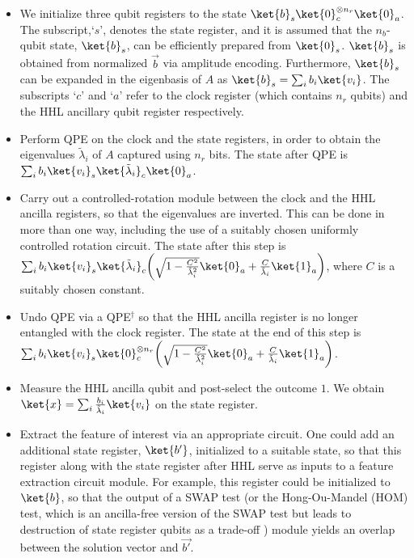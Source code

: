 \documentclass[%
 reprint,
 superscriptaddress,
 amsmath,amssymb,
 aps,
 pra,
floatfix,
nofootinbib,
]{revtex4-2}
\theoremstyle{definition}
\theoremstyle{remark}
\begin{document}
\begin{appendix}
\begin{itemize} 
\item We initialize three qubit registers to the state $\ket{b}_s\ket{0}^{\otimes n_r}_c\ket{0}_a$. The subscript,`$s$', denotes the state register, and it is assumed that the $n_b$-qubit state, $\ket{b}_s$, can be efficiently prepared from $\ket{0}_s$. $\ket{b}_s$ is obtained from normalized $\vec{b}$ via amplitude encoding. Furthermore, $\ket{b}_s$ can be expanded in the eigenbasis of $A$ as $\ket{b}_s=\sum_i b_i\ket{v_i}$. The subscripts `$c$' and `$a$' refer to the clock register (which contains $n_r$ qubits) and the HHL ancillary qubit register respectively. 
\item Perform QPE on the clock and the state registers, in order to obtain the eigenvalues ${\tilde{\lambda}_i}$ of $A$ captured using $n_r$ bits. The state after QPE is $\sum_i b_i\ket{v_i}_s\ket{\tilde{\lambda}_i}_c\ket{0}_a$. 
\item Carry out a controlled-rotation module between the clock and the HHL ancilla registers, so that the eigenvalues are inverted. This can be done in more than one way, including the use of a suitably chosen uniformly controlled rotation circuit. The state after this step is $\sum_i b_i\ket{v_i}_s\ket{\tilde{\lambda}_i}_c\bigg(\sqrt{1-\frac{C^2}{\tilde{\lambda}_i^2}}\ket{0}_a+\frac{C}{\tilde{\lambda}_i}\ket{1}_a\bigg)$, where $C$ is a suitably chosen constant. 
\item Undo QPE via a QPE$^\dag$ so that the HHL ancilla register is no longer entangled with the clock register. The state at the end of this step is $\sum_i b_i\ket{v_i}_s\ket{0}_c^{\otimes n_r}\bigg(\sqrt{1-\frac{C^2}{\tilde{\lambda}_i^2}}\ket{0}_a+\frac{C}{\tilde{\lambda}_i}\ket{1}_a\bigg)$.  
\item Measure the HHL ancilla qubit and post-select the outcome $1$. We obtain $\ket{x}=\sum_i\frac{b_i}{\tilde{\lambda}_i}\ket{v_i}$ on the state register. 
\item Extract the feature of interest via an appropriate circuit. One could add an additional state register, $\ket{b'}$, initialized to a suitable state, so that this register along with the state register after HHL serve as inputs to a feature extraction circuit module. For example, this register could be initialized to $\ket{b}$, so that the output of a SWAP test \cite{cswap} (or the Hong-Ou-Mandel (HOM) test, which is an ancilla-free version of the SWAP test but leads to destruction of state register qubits as a trade-off \cite{HOM}) module yields an overlap between the solution vector and $\vec{b'}$. 
\end{itemize} 


\end{appendix}
\end{document}
